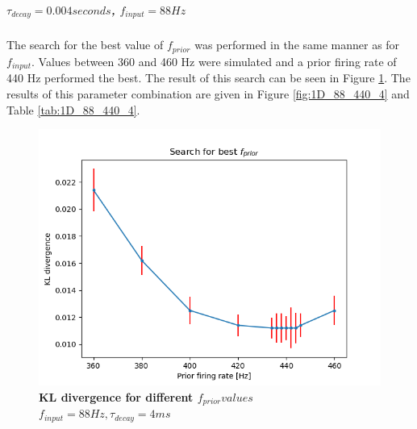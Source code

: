\subparagraph{$\tau_{decay} = 0.004 seconds$, $f_{input} = 88 Hz$}
The search for the best value of $f_{prior}$ was performed in the same manner as for $f_{input}$. Values between 360 and 460 Hz were simulated and a prior firing rate of 440 Hz performed the best. The result of this search can be seen in Figure \ref{fig:1D_KLD_fInput88_tau4}. The results of this parameter combination are given in Figure \ref{fig:1D_88_440_4} and Table \ref{tab:1D_88_440_4}.

\begin{figure}
  \includegraphics[width=\linewidth]{figures/1D/KLDvsfPrior_fInput88tau4.png}
  \caption{\textbf{KL divergence for different $f_{prior} values$} $f_{input} = 88 Hz, \tau_{decay} = 4 ms$}
  \label{fig:1D_KLD_fInput88_tau4}
\end{figure}

